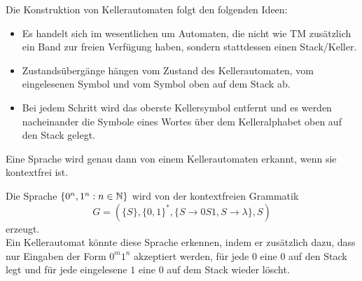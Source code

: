 \begin{bem}
Die Konstruktion von Kellerautomaten folgt den folgenden Ideen:
\begin{itemize}
    \item Es handelt sich im wesentlichen um Automaten, die nicht wie TM zusätzlich ein Band zur freien Verfügung haben, sondern stattdessen einen Stack/Keller.
    \item Zustandsübergänge hängen vom Zustand des Kellerautomaten, vom eingelesenen Symbol und vom Symbol oben auf dem Stack ab.
    \item Bei jedem Schritt wird das oberste Kellersymbol entfernt und es werden nacheinander die Symbole eines Wortes über dem Kelleralphabet oben auf den Stack gelegt.
\end{itemize}
\end{bem}

\begin{satz}{}
Eine Sprache wird genau dann von einem Kellerautomaten erkannt, wenn sie kontextfrei ist.
\end{satz}

\begin{exam}
Die Sprache $\{0^n, 1^n : n \in \mathbb{N} \}$ wird von der kontextfreien Grammatik
$$ G = (\{S\}, \{0, 1\}^*, \{S \to 0S1, S \to \lambda \}, S) $$
erzeugt.\\
Ein Kellerautomat könnte diese Sprache erkennen, indem er zusätzlich dazu, dass nur Eingaben der Form $0^m 1^n$ akzeptiert werden, für jede $0$ eine $0$ auf den Stack legt und für jede eingelesene $1$ eine $0$ auf dem Stack wieder löscht.
\end{exam}
